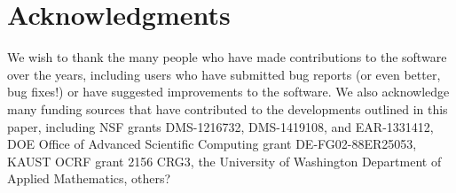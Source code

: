 %
%


\section*{Acknowledgments} 

We wish to thank the many people who have made contributions to the 
\clawpack software over the years, including users who have submitted bug
reports (or even better, bug fixes!) or have suggested
improvements to the software.  We also acknowledge many funding sources that
have contributed to the developments outlined in this paper, including
NSF grants DMS-1216732, DMS-1419108, and EAR-1331412,
DOE Office of Advanced Scientific Computing grant DE-FG02-88ER25053,
KAUST OCRF grant 2156 CRG3,
the University of Washington Department of Applied Mathematics,
\alert{others?}


